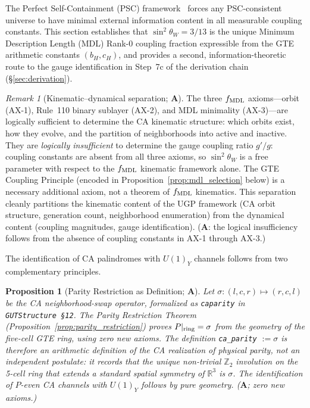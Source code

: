 \documentclass[11pt]{article}
\newtheorem{proposition}[theorem]{Proposition}
\theoremstyle{remark}
\newtheorem{remark}[theorem]{Remark}
\newcommand{\bH}{b_H}
\newcommand{\cH}{c_H}
\newcommand{\lean}[1]{%
  \penalty-100
  \begingroup\def\_{\textunderscore\allowbreak}\texttt{#1}\endgroup}
\newcommand{\sinwsq}{\sin^2\!\theta_W}
\newcommand{\CatA}{\textbf{A}}
\begin{document}
The Perfect Self-Containment (PSC) framework~\cite{Spivack2025_UGPUniqueness} forces
any PSC-consistent universe to have minimal external information content in all
measurable coupling constants.
This section establishes that $\sinwsq = 3/13$ is the unique Minimum Description
Length (MDL) Rank-0 coupling fraction expressible from the GTE arithmetic constants
$(\bH, \cH)$, and provides a second, information-theoretic route to the gauge
identification in Step~7c of the derivation chain (\S\ref{sec:derivation}).

\begin{remark}[Kinematic--dynamical separation; $\CatA$]
\label{rem:kinematic_dynamical}
The three $f_{\rm MDL}$ axioms---orbit (AX-1), Rule~110 binary sublayer (AX-2), and
MDL minimality (AX-3)---are logically sufficient to determine the CA kinematic
structure: which orbits exist, how they evolve, and the partition of neighborhoods
into active and inactive.
They are \emph{logically insufficient} to determine the gauge coupling ratio $g'/g$:
coupling constants are absent from all three axioms, so $\sinwsq$ is a free
parameter with respect to the $f_{\rm MDL}$ kinematic framework alone.
The GTE Coupling Principle (encoded in Proposition~\ref{prop:mdl_selection} below)
is a necessary additional axiom, not a theorem of $f_{\rm MDL}$ kinematics.
This separation cleanly partitions the kinematic content of the UGP framework (CA
orbit structure, generation count, neighborhood enumeration) from the dynamical
content (coupling magnitudes, gauge identification).
($\CatA$: the logical insufficiency follows from the absence of coupling constants
in AX-1 through AX-3.)
\end{remark}

The identification of CA palindromes with $U(1)_Y$ channels follows from two
complementary principles.

\begin{proposition}[Parity Restriction as Definition; $\CatA$]
\label{prop:parity_as_def}
Let $\sigma: (l,c,r) \mapsto (r,c,l)$ be the CA neighborhood-swap operator,
formalized as \lean{ca\_parity} in \texttt{GUTStructure~\S12}.
The Parity Restriction Theorem (Proposition~\ref{prop:parity_restriction})
proves $P|_{\rm ring} = \sigma$ from the geometry of the five-cell GTE ring,
using zero new axioms.
The definition \texttt{ca\_parity} $:= \sigma$ is therefore an arithmetic
\emph{definition} of the CA realization of physical parity, not an independent
postulate: it records that the unique non-trivial $\mathbb{Z}_2$ involution on
the 5-cell ring that extends a standard spatial symmetry of $\mathbb{R}^3$ is $\sigma$.
The identification of $P$-even CA channels with $U(1)_Y$ follows by pure geometry.
($\CatA$; zero new axioms.)
\end{proposition}
\end{document}
